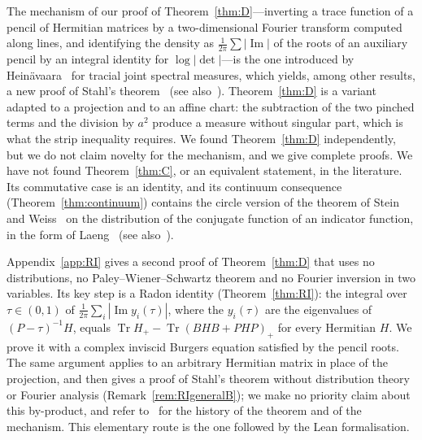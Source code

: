 \documentclass[11pt]{amsart}
\theoremstyle{definition}
\theoremstyle{remark}
\numberwithin{equation}{section}
\newcommand{\Tr}{\operatorname{Tr}}
\renewcommand{\Im}{\operatorname{Im}}
\begin{document}
The mechanism of our proof of Theorem~\ref{thm:D}---inverting a trace function of a pencil of Hermitian matrices
by a two-dimensional Fourier transform computed along lines, and identifying the density as
$\frac1{2\pi}\sum|\Im|$ of the roots of an auxiliary pencil by an integral identity for $\log|\det|$---is the one
introduced by Hein\"avaara~\cite{He} for tracial joint spectral measures, which yields, among other
results, a new proof of Stahl's theorem~\cite{Stahl} (see also~\cite{Eremenko,LS}). Theorem~\ref{thm:D} is a variant
adapted to a projection and to an affine chart: the subtraction of the two pinched terms and the division by $a^2$
produce a measure without singular part, which is what the strip inequality requires. We found Theorem~\ref{thm:D}
independently, but we do not claim novelty for the mechanism, and we give complete proofs. We have not found
Theorem~\ref{thm:C}, or an equivalent statement, in the literature. Its commutative case is an identity, and its
continuum consequence (Theorem~\ref{thm:continuum}) contains the circle version of the theorem of Stein and
Weiss~\cite{SW} on the distribution of the conjugate function of an indicator function, in the form of
Laeng~\cite{Laeng} (see also~\cite{Boole,CLM}).

Appendix~\ref{app:RI} gives a second proof of Theorem~\ref{thm:D} that uses no distributions, no Paley--Wiener--Schwartz
theorem and no Fourier inversion in two variables. Its key step is a Radon identity (Theorem~\ref{thm:RI}): the integral over
$\tau\in(0,1)$ of $\frac1{2\pi}\sum_i|\Im y_i(\tau)|$, where the $y_i(\tau)$ are the eigenvalues of $(P-\tau)^{-1}H$, equals
$\Tr H_+-\Tr(BHB+PHP)_+$ for every Hermitian $H$. We prove it with a complex inviscid Burgers equation satisfied by the
pencil roots. The same argument applies to an arbitrary Hermitian matrix in place of the projection, and then gives a
proof of Stahl's theorem without distribution theory or Fourier analysis (Remark~\ref{rem:RIgeneralB}); we make no
priority claim about this by-product, and refer to~\cite{Stahl,Eremenko,He} for the history of the theorem and of the
mechanism. This elementary route is the one followed by the Lean formalisation.
\end{document}
